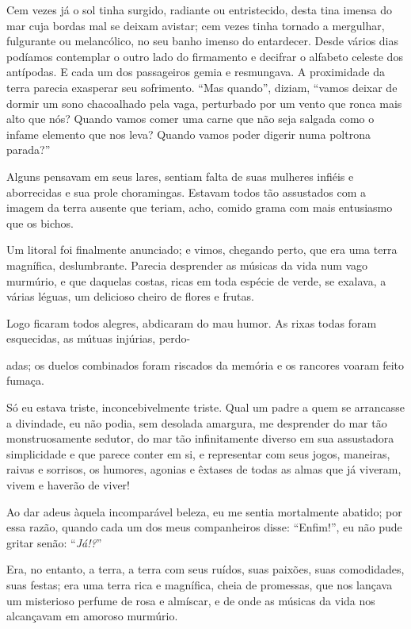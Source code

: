 Cem vezes já o sol tinha surgido, radiante ou entristecido, desta tina
imensa do mar cuja bordas mal se deixam avistar; cem vezes tinha
tornado a mergulhar, fulgurante ou melancólico, no seu banho imenso do
entardecer. Desde vários dias podíamos contemplar o outro lado do
firmamento e decifrar o alfabeto celeste dos antípodas. E cada um dos
passageiros gemia e resmungava. A proximidade da
terra parecia exasperar seu sofrimento. “Mas quando'',
 diziam, “vamos deixar de dormir
um sono chacoalhado pela vaga, perturbado por um vento que ronca mais
alto que nós? Quando vamos comer uma carne que não seja
salgada como o infame elemento que nos leva? Quando vamos poder
digerir numa poltrona parada?''

Alguns pensavam em seus lares, sentiam falta de suas mulheres
infiéis e aborrecidas e sua prole choramingas. Estavam todos tão
assustados com a imagem da terra ausente que teriam, acho, comido
grama com mais entusiasmo que os bichos.

Um litoral foi finalmente anunciado; e vimos, chegando perto, que era
uma terra magnífica, deslumbrante. Parecia desprender as músicas da vida
num vago murmúrio, e que daquelas costas, ricas em toda
espécie de verde, se exalava, a várias léguas, um delicioso cheiro de
flores e frutas.

Logo ficaram todos alegres, abdicaram do mau humor.
As rixas todas foram esquecidas, as mútuas injúrias, perdo-

\quebra

\noindent{}adas; os duelos combinados foram riscados da memória e os rancores voaram
feito fumaça.

Só eu estava triste, inconcebivelmente triste. Qual um padre a
quem se arrancasse a divindade, eu não podia, sem desolada amargura, me
desprender do mar tão monstruosamente sedutor, do mar tão
infinitamente diverso em sua assustadora simplicidade e que parece
conter em si, e representar com seus jogos, maneiras, raivas e
sorrisos, os humores, agonias e êxtases de todas as almas
que já viveram, vivem e haverão de viver!

Ao dar adeus àquela incomparável beleza, eu me sentia mortalmente abatido;
por essa razão, quando cada um dos meus companheiros disse:
“Enfim!'', eu não pude gritar senão:
“\textit{Já!?}'' 

Era, no entanto, a terra, a terra com seus ruídos, suas paixões, suas
comodidades, suas festas; era uma terra rica e magnífica, cheia de
promessas, que nos lançava um misterioso perfume de rosa e almíscar,
e de onde as músicas da vida nos alcançavam em amoroso murmúrio.

